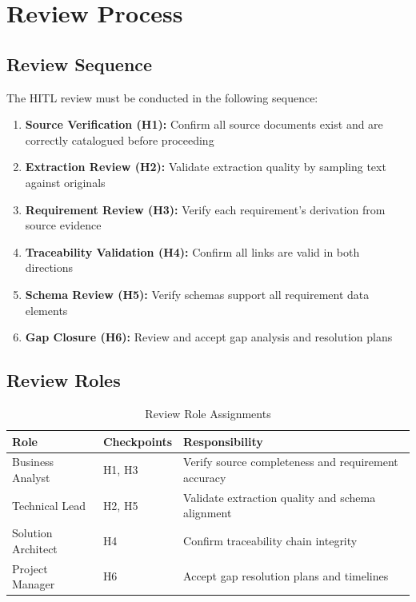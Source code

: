 \documentclass[11pt,a4paper,twoside]{report}
\begin{document}
\section{Review Process}
\label{sec:review-process}

\subsection{Review Sequence}

The HITL review must be conducted in the following sequence:

\begin{enumerate}
\item \textbf{Source Verification (H1):} Confirm all source documents exist
and are correctly catalogued before proceeding
\item \textbf{Extraction Review (H2):} Validate extraction quality by
sampling text against originals
\item \textbf{Requirement Review (H3):} Verify each requirement's derivation
from source evidence
\item \textbf{Traceability Validation (H4):} Confirm all links are valid
in both directions
\item \textbf{Schema Review (H5):} Verify schemas support all requirement
data elements
\item \textbf{Gap Closure (H6):} Review and accept gap analysis and
resolution plans
\end{enumerate}

\subsection{Review Roles}

\begin{table}[h]
\centering
\caption{Review Role Assignments}
\label{tab:review-roles}
\begin{tabularx}{\textwidth}{@{}L{4cm}L{3.5cm}L{6cm}@{}}
\toprule
\textbf{Role} & \textbf{Checkpoints} & \textbf{Responsibility} \\
\midrule
Business Analyst & H1, H3 & Verify source completeness and requirement accuracy \\
Technical Lead & H2, H5 & Validate extraction quality and schema alignment \\
Solution Architect & H4 & Confirm traceability chain integrity \\
Project Manager & H6 & Accept gap resolution plans and timelines \\
\bottomrule
\end{tabularx}
\end{table}
\end{document}
